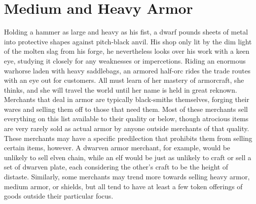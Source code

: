 \documentclass[10pt,a4paper,twoside,twocolumn,openany,nodeprecatedcode,bg=print]{dndbook}
\begin{document}
\section{Medium and Heavy Armor}
Holding a hammer as large and heavy as his fist, a dwarf pounds sheets of metal into protective shapes against pitch-black anvil. His shop only lit by the dim light of the molten slag from his forge, he nevertheless looks over his work with a keen eye, studying it closely for any weaknesses or impercetions.
Riding an enormous warhorse laden with heavy saddlebags, an armored half-orc rides the trade routes with an eye out for customers. All must learn of her mastery of armorcraft, she thinks, and she will travel the world until her name is held in great reknown.
Merchants that deal in armor are typically black-smiths themselves, forging their wares and selling them off to those that need them. Most of these merchants sell everything on this list available to their quality or below, though atrocious items are very rarely sold as actual armor by anyone outside merchants of that quality.
These merchants may have a specific predilection that prohibits them from selling certain items, however. A dwarven armor merchant, for example, would be unlikely to sell elven chain, while an elf would be just as unlikely to craft or sell a set of dwarven plate, each considering the other's craft to be the height of distaste. Similarly, some merchants may trend more towards selling heavy armor, medium armor, or shields, but all tend to have at least a few token offerings of goods outside their particular focus.
\end{document}
